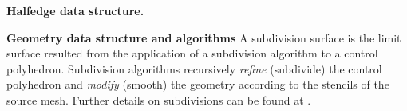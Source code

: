 \noindent \textbf{Halfedge data structure.}


\noindent \textbf{Geometry data structure and algorithms}
A subdivision surface is the limit surface resulted from the
application of a subdivision algorithm to a control polyhedron.
Subdivision algorithms recursively \emph{refine} (subdivide) the
control polyhedron and \emph{modify} (smooth) the geometry according
to the stencils of the source mesh.  
Further details on
subdivisions can be found at \cite{Sub:course:2000}.

